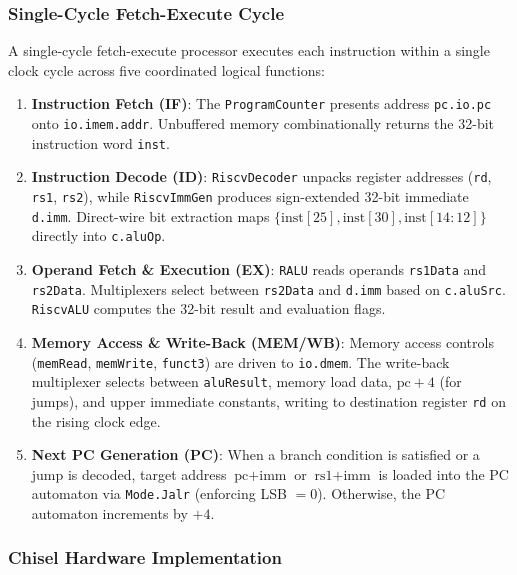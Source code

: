 \subsubsection{Single-Cycle Fetch-Execute Cycle}

A single-cycle fetch-execute processor executes each instruction within a single clock cycle across five coordinated logical functions:
\begin{enumerate}
    \item \textbf{Instruction Fetch (IF)}: The \texttt{ProgramCounter} presents address \texttt{pc.io.pc} onto \texttt{io.imem.addr}. Unbuffered memory combinationally returns the 32-bit instruction word \texttt{inst}.
    \item \textbf{Instruction Decode (ID)}: \texttt{RiscvDecoder} unpacks register addresses (\texttt{rd}, \texttt{rs1}, \texttt{rs2}), while \texttt{RiscvImmGen} produces sign-extended 32-bit immediate \texttt{d.imm}. Direct-wire bit extraction maps $\{\text{inst}[25], \text{inst}[30], \text{inst}[14:12]\}$ directly into \texttt{c.aluOp}.
    \item \textbf{Operand Fetch \& Execution (EX)}: \texttt{RALU} reads operands \texttt{rs1Data} and \texttt{rs2Data}. Multiplexers select between \texttt{rs2Data} and \texttt{d.imm} based on \texttt{c.aluSrc}. \texttt{RiscvALU} computes the 32-bit result and evaluation flags.
    \item \textbf{Memory Access \& Write-Back (MEM/WB)}: Memory access controls (\texttt{memRead}, \texttt{memWrite}, \texttt{funct3}) are driven to \texttt{io.dmem}. The write-back multiplexer selects between \texttt{aluResult}, memory load data, $\text{pc} + 4$ (for jumps), and upper immediate constants, writing to destination register \texttt{rd} on the rising clock edge.
    \item \textbf{Next PC Generation (PC)}: When a branch condition is satisfied or a jump is decoded, target address $\text{pc} + \text{imm}$ or $\text{rs1} + \text{imm}$ is loaded into the PC automaton via \texttt{Mode.Jalr} (enforcing LSB $= 0$). Otherwise, the PC automaton increments by $+4$.
\end{enumerate}

\subsubsection{Chisel Hardware Implementation}


